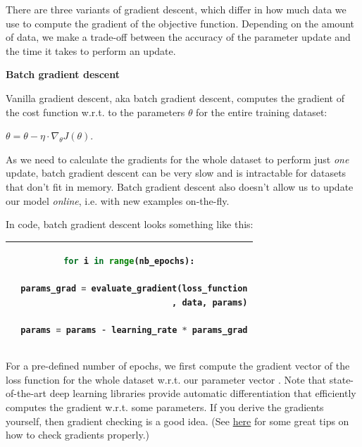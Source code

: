 \documentclass[4pt,journal,compsoc]{IEEEtran}
\begin{document}
\begin{flushleft}
    There are three variants of gradient descent, which differ in how much data we use to compute the gradient of the objective function. Depending on the amount of data, we make a trade-off between the accuracy of the parameter update and the time it takes to perform an update. \newline \newline
    
    
    \textbf{\Large Batch gradient descent} \newline
    
    Vanilla gradient descent, aka batch gradient descent, computes the gradient of the cost function w.r.t. to the parameters $\theta$ for the entire training dataset: \newline
    
    $\theta = \theta - \eta \cdot \nabla _ \theta J(\theta)$. \newline
    
    As we need to calculate the gradients for the whole dataset to perform just \textit{one} update, batch gradient descent can be very slow and is intractable for datasets that don't fit in memory. Batch gradient descent also doesn't allow us to update our model \textit{online}, i.e. with new examples on-the-fly. \newline
    
    In code, batch gradient descent looks something like this: \newline
            
    \begin{tabular}{|||c|} 
        \hline
        \begin{lstlisting}[language=Python]
for i in range(nb_epochs):

  params_grad = evaluate_gradient(loss_function
                                , data, params)
    
  params = params - learning_rate * params_grad
        \end{lstlisting} \\
        \hline
        \end{tabular} \newline \newline
    
    For a pre-defined number of epochs, we first compute the gradient vector  of the loss function for the whole dataset w.r.t. our parameter vector . Note that state-of-the-art deep learning libraries provide automatic differentiation that efficiently computes the gradient w.r.t. some parameters. If you derive the gradients yourself, then gradient checking is a good idea. (See \underline{here} for some great tips on how to check gradients properly.) \newline
    

\end{flushleft}
\end{document}

